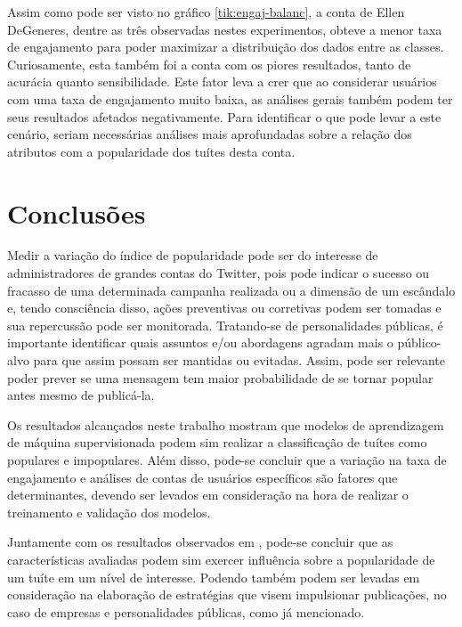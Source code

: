 \documentclass[oneside,openright,12pt]{ufsm_2015} %
\begin{document}
    \par Assim como pode ser visto no gráfico \ref{tik:engaj-balanc}, a conta de Ellen DeGeneres, dentre as três observadas nestes experimentos, obteve a menor taxa de engajamento para poder maximizar a distribuição dos dados entre as classes. Curiosamente, esta também foi a conta com os piores resultados, tanto de acurácia quanto sensibilidade. Este fator leva a crer que ao considerar usuários com uma taxa de engajamento muito baixa, as análises gerais também podem ter seus resultados afetados negativamente. Para identificar o que pode levar a este cenário, seriam necessárias análises mais aprofundadas sobre a relação dos atributos com a popularidade dos tuítes desta conta.


\chapter{Conclusões}
\label{sec:conclusao}

    \par Medir a variação do índice de popularidade pode ser do interesse de administradores de grandes contas do Twitter, pois pode indicar o sucesso ou fracasso de uma determinada campanha realizada ou a dimensão de um escândalo e, tendo consciência disso, ações preventivas ou corretivas podem ser tomadas e sua repercussão pode ser monitorada. Tratando-se de personalidades públicas, é importante identificar quais assuntos e/ou abordagens agradam mais o público-alvo para que assim possam ser mantidas ou evitadas. Assim, pode ser relevante poder prever se uma mensagem tem maior probabilidade de se tornar popular antes mesmo de publicá-la.
    
    \par Os resultados alcançados neste trabalho mostram que modelos de aprendizagem de máquina supervisionada podem sim realizar a classificação de tuítes como populares e impopulares. Além disso, pode-se concluir que a variação na taxa de engajamento e análises de contas de usuários específicos são fatores que determinantes, devendo ser levados em consideração na hora de realizar o treinamento e validação dos modelos.
    
    \par Juntamente com os resultados observados em \cite{artigo:oliveira:18}, pode-se concluir que as características avaliadas podem sim exercer influência sobre a popularidade de um tuíte em um nível de interesse. Podendo também podem ser levadas em consideração na elaboração de estratégias que visem impulsionar publicações, no caso de empresas e personalidades públicas, como já mencionado. 
\end{document}
